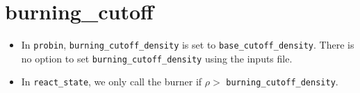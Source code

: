 \section{burning\_cutoff}

\begin{itemize}

\item In {\tt probin}, {\tt burning\_cutoff\_density} is set to 
  {\tt base\_cutoff\_density}.  There is no option to set 
  {\tt burning\_cutoff\_density} using the inputs file.

\item In {\tt react\_state}, we only call the burner if 
  $\rho >$ {\tt burning\_cutoff\_density}.

\end{itemize}

